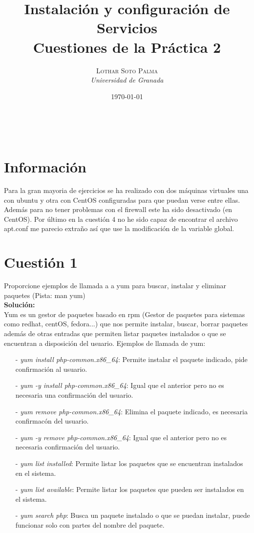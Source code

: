\documentclass[a4paper, 11pt]{article} %
\title{\textbf{Instalación y configuración de Servicios}\\ %
\vspace{20 pt}
Cuestiones de la Práctica 2} %
\author{\textsc{Lothar Soto Palma} %
\\{\textit{Universidad de Granada}}} %
\date{\today} %
\makeatletter
\renewcommand{\maketitle}{ %
\begin{center} %
{\Huge\@title} %
\end{center}

\vspace{20pt} %

\begin{flushright} %
{\large\@author} %
\\\@date %

\vspace{40pt} %
\end{flushright}
}
\makeatother
\begin{document}
\maketitle
\pagebreak
\tableofcontents
\pagebreak
\listoffigures
\section{Información}
Para la gran mayoria de ejercicios se ha realizado con dos máquinas virtuales una con ubuntu y otra con CentOS configuradas para que puedan verse entre ellas. Además para no tener problemas con el firewall este ha sido desactivado (en CentOS). Por último en la cuestión 4 no he sido capaz de encontrar el archivo apt.conf me parecio extraño así que use la modificación de la variable global.
\section{Cuestión 1}
Proporcione ejemplos de llamada a a yum para buscar, instalar y eliminar paquetes (Pista: man yum)\\
\textbf{Solución:}\\
Yum es un gestor de paquetes basado en rpm (Gestor de paquetes para sistemas como redhat, centOS, fedora...) que nos permite instalar, buscar, borrar paquetes además de otras entradas que permiten listar paquetes instalados o que se encuentran a disposición del usuario. Ejemplos de llamada de yum:
\begin{itemize}
\item[-] \textit{yum install php-common.x86\_64}: Permite instalar el paquete indicado, pide confirmación al usuario.
\item[-] \textit{yum -y install php-common.x86\_64}: Igual que el anterior pero no es necesaria una confirmación del usuario.
\item[-] \textit{yum remove php-common.x86\_64}: Elimina el paquete indicado, es necesaria confirmacón del usuario.
\item[-] \textit{yum -y remove php-common.x86\_64}: Igual que el anterior pero no es necesaria confirmación del usuario.
\item[-] \textit{yum list installed}: Permite listar los paquetes que se encuentran instalados en el sistema.
\item[-] \textit{yum list available}: Permite listar los paquetes que pueden ser instalados en el sistema.
\item[-] \textit{yum search php}: Busca un paquete instalado o que se puedan instalar, puede funcionar solo con partes del nombre del paquete.
\end{itemize}
\end{document}
